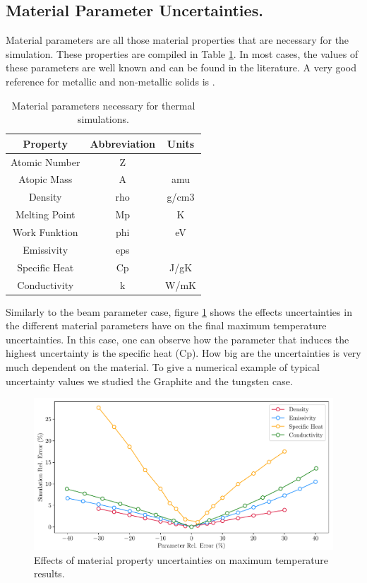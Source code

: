 \subsection{Material Parameter Uncertainties.}

Material parameters are all those material properties that are necessary for the simulation. These properties are compiled in Table \ref{tab:MaterialProp}. In most cases, the values of these parameters are well known and can be found in the literature. A very good reference for metallic and non-metallic solids is \parencite[][]{ref:MatProperties}.  

\begin{table}[h]
    \centering
    \begin{tabular}{ccc}
    \hline
    \textbf{Property} & \textbf{Abbreviation} & \textbf{Units} \\ \hline
    Atomic Number     & Z                     &                \\
    Atopic Mass       & A                     & amu            \\
    Density           & rho                   & g/cm3          \\
    Melting Point     & Mp                    & K              \\
    Work Funktion     & phi                   & eV             \\
    Emissivity        & eps                   &                \\
    Specific Heat     & Cp                    & J/gK           \\
    Conductivity      & k                     & W/mK           \\ \hline
    \end{tabular}
    \caption{Material parameters necessary for thermal simulations.}
    \label{tab:MaterialProp}
    \end{table}

Similarly to the beam parameter case, figure  \ref{fig:MatPar} shows the effects uncertainties in the different material parameters have on the final maximum temperature uncertainties. In this case, one can observe how the parameter that induces the highest uncertainty is the specific heat (Cp). How big are the uncertainties is very much dependent on the material. To give a numerical example of typical uncertainty values we studied the Graphite and the tungsten case. 

\begin{figure}[h]
    \centering
    \includegraphics[width=0.7\columnwidth]{MaterialParameterUncertainty/MatParUnc.pdf}
    \caption{Effects of material property uncertainties on maximum temperature results.}
    \label{fig:MatPar}
\end{figure}

